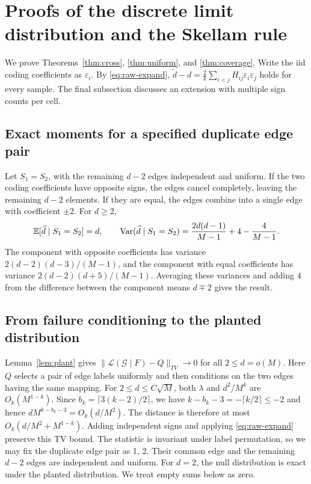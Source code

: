 \section{Proofs of the discrete limit distribution and the Skellam rule}\label{app:inversion}
We prove Theorems~\ref{thm:cross}, \ref{thm:uniform}, and \ref{thm:coverage}. Write the iid coding coefficients as $\varepsilon_i$. By \eqref{eq:raw-expand}, $\widetilde d-d=\frac2k\sum_{i<j}H_{ij}\varepsilon_i\varepsilon_j$ holds for every sample. The final subsection discusses an extension with multiple sign counts per cell.

\subsection{Exact moments for a specified duplicate edge pair}
Let $S_1=S_2$, with the remaining $d-2$ edges independent and uniform. If the two coding coefficients have opposite signs, the edges cancel completely, leaving the remaining $d-2$ elements. If they are equal, the edges combine into a single edge with coefficient $\pm2$. For $d\ge2$,
\begin{equation*}
\mathbb E[\widehat d\mid S_1=S_2]=d,\qquad
\operatorname{Var}(\widehat d\mid S_1=S_2)=\frac{2d(d-1)}{M-1}+4-\frac4{M-1}.
\end{equation*}
The component with opposite coefficients has variance $2(d-2)(d-3)/(M-1)$, and the component with equal coefficients has variance $2(d-2)(d+5)/(M-1)$. Averaging these variances and adding $4$ from the difference between the component means $d\mp2$ gives the result.

\subsection{From failure conditioning to the planted distribution}
Lemma~\ref{lem:plant} gives $\|\mathcal L(\mathcal G\mid F)-Q\|_{TV}\to0$ for all $2\le d=o(M)$. Here $Q$ selects a pair of edge labels uniformly and then conditions on the two edges having the same mapping. For $2\le d\le C\sqrt M$, both $\lambda$ and $d^2/M^k$ are $O_k(M^{1-k})$. Since $b_k=\lceil3(k-2)/2\rceil$, we have $k-b_k-3=-\lceil k/2\rceil\le-2$ and hence $dM^{k-b_k-3}=O_k(d/M^2)$. The distance is therefore at most $O_k(d/M^2+M^{1-k})$. Adding independent signs and applying \eqref{eq:raw-expand} preserve this TV bound. The statistic is invariant under label permutation, so we may fix the duplicate edge pair as 1, 2. Their common edge and the remaining $d-2$ edges are independent and uniform. For $d=2$, the null distribution is exact under the planted distribution. We treat empty sums below as zero.

